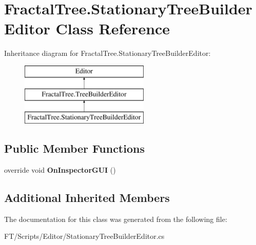 \hypertarget{class_fractal_tree_1_1_stationary_tree_builder_editor}{}\section{Fractal\+Tree.\+Stationary\+Tree\+Builder\+Editor Class Reference}
\label{class_fractal_tree_1_1_stationary_tree_builder_editor}
Inheritance diagram for Fractal\+Tree.\+Stationary\+Tree\+Builder\+Editor\+:\begin{figure}[H]
\begin{center}
\leavevmode
\includegraphics[height=3.000000cm]{class_fractal_tree_1_1_stationary_tree_builder_editor}
\end{center}
\end{figure}
\subsection*{Public Member Functions}
\begin{DoxyCompactItemize}
\item 
\mbox{\label{class_fractal_tree_1_1_stationary_tree_builder_editor_a8a98e0bcfbd7f645a7aa4ef051cfb404}} 
override void {\bfseries On\+Inspector\+G\+UI} ()
\end{DoxyCompactItemize}
\subsection*{Additional Inherited Members}


The documentation for this class was generated from the following file\+:\begin{DoxyCompactItemize}
\item 
F\+T/\+Scripts/\+Editor/Stationary\+Tree\+Builder\+Editor.\+cs\end{DoxyCompactItemize}
